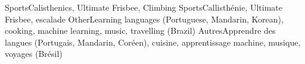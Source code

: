   
    \resumeSubHeadingListStart
        \resumeSubheadingEnFr
            {Sports}{}{Calisthenics, Ultimate Frisbee, Climbing}{}
            {Sports}{}{Callisthénie, Ultimate Frisbee, escalade}{}
        \resumeSubheadingEnFr
            {Other}{}{Learning languages (Portuguese, Mandarin, Korean), cooking, machine learning, music, travelling (Brazil)}{}
            {Autres}{}{Apprendre des langues (Portugais, Mandarin, Coréen), cuisine, apprentissage machine, musique, voyages (Brésil)}{}
    \resumeSubHeadingListEnd
